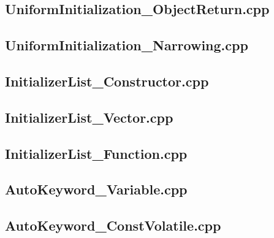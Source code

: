 \documentclass[11pt]{report}
\begin{document}
\begin{appendix}
\subsection{UniformInitialization\_ObjectReturn.cpp}
\label{UniformInitialization_ObjectReturn}


\subsection{UniformInitialization\_Narrowing.cpp}
\label{UniformInitialization_Narrowing}


\subsection{InitializerList\_Constructor.cpp}
\label{InitializerList_Constructor}


\subsection{InitializerList\_Vector.cpp}
\label{InitializerList_Vector}


\subsection{InitializerList\_Function.cpp}
\label{InitializerList_Function}


\subsection{AutoKeyword\_Variable.cpp}
\label{AutoKeyword_Variable}


\subsection{AutoKeyword\_ConstVolatile.cpp}
\label{AutoKeyword_ConstVolatile}



\end{appendix}
\end{document}
